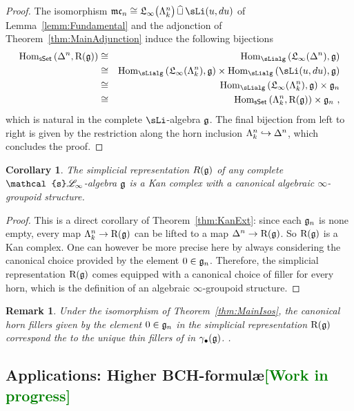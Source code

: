 \documentclass[twoside, 10pt]{amsart}
\newtheorem{remark}[lemma]{Remark}
\newtheorem{corollary}[lemma]{Corollary}
\begin{document}
\begin{proof}
The isomorphism $\mc_n\cong \Li\big(\Ho{k}{n}\big)\,\widehat{\sqcup}\, \sLi(u, du)$
of Lemma~\ref{lemm:Fundamental} and the adjonction of Theorem~\ref{thm:MainAdjunction} induce the following bijections
\begin{eqnarray*}
\Hom_\sSe\left(\De{n}, \R(\g)\right)&\cong &\Hom_{\sLialg}\left(\Li(\De{n}), \g\right)\\
&\cong& \Hom_{\sLialg}\left(\Li(\Ho{k}{n}), \g\right)\times  \Hom_{\sLialg}\left(\sLi(u, du), \g\right)\\
&\cong& \Hom_{\sLialg}\left(\Li(\Ho{k}{n}), \g\right)\times  \g_n\\
&\cong& \Hom_\sSe\left(\Ho{k}{n}, \R(\g)\right)\times  \g_n\ ,
\end{eqnarray*}
which is natural in the complete $\sLi$-algebra $\g$. The final bijection from left to right is given by the restriction along the horn inclusion $\Ho{k}{n}\hookrightarrow \De{n}$, which concludes the proof.
\end{proof}

\begin{corollary}
The simplicial representation $R(\g)$ of any complete $\mathcal{s}\L_\infty$-algebra $\g$ is a Kan complex with a canonical algebraic $\infty$-groupoid structure. 
\end{corollary}

\begin{proof}
This is a direct corollary of Theorem~\ref{thm:KanExt}: since each $\g_n$ is none empty, 
every map $\Ho{k}{n} \to \R(\g)$ can be lifted to a map $\De{n} \to \R(\g)$. So $\R(\g)$ is a Kan complex. One can however be more precise here by always considering the canonical choice provided by  the element $0\in \g_n$. Therefore, the simplicial representation $\R(\g)$ comes equipped with a canonical choice of filler for every horn, which is the definition of an algebraic $\infty$-groupoid structure. 
\end{proof}

\begin{remark}
Under the isomorphism of Theorem~\ref{thm:MainIsos}, the canonical horn fillers given by the element $0\in\g_n$ in the simplicial representation $\R(\g)$ correspond the to the unique thin fillers of \cite[Theorem~5.4]{Getzler09} in $\gamma_\bullet(\g)$. .
\end{remark}

\subsection{Applications: Higher BCH-formul\ae \textcolor{green}{[Work in progress]}}
\end{document}
